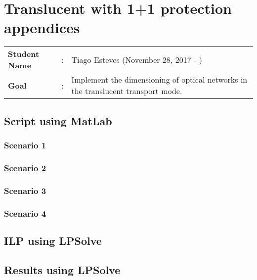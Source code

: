 \clearpage

\section{Translucent with 1+1 protection appendices}
\begin{tcolorbox}	
\begin{tabular}{p{2.75cm} p{0.2cm} p{10.5cm}} 	
\textbf{Student Name}  &:& Tiago Esteves    (November 28, 2017 - )\\
\textbf{Goal}          &:& Implement the dimensioning of optical networks in the translucent transport mode.
\end{tabular}
\end{tcolorbox}


\subsection{Script using MatLab}

\subsubsection{Scenario 1}

\subsubsection{Scenario 2}

\subsubsection{Scenario 3}

\subsubsection{Scenario 4}


\subsection{ILP using LPSolve}

\subsection{Results using LPSolve}
